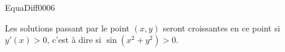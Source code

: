 \begin{corrige}{EquaDiff0006}

Les solutions passant par le point $(x,y)$ seront croissantes en ce point si $y'(x)>0$, c'est à dire si $\sin(x^2+y^2)>0$.

%

\end{corrige}
